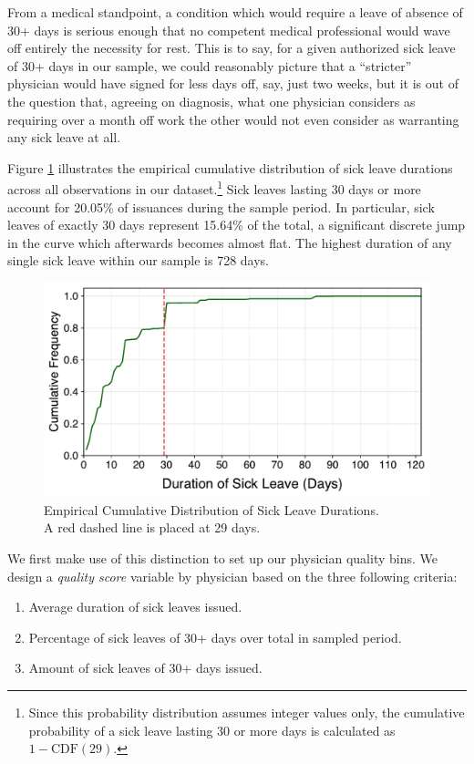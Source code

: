 \documentclass[../main.tex]{subfiles}
\begin{document}
From a medical standpoint, a condition which would require a leave of absence of 30+ days is serious enough that no competent medical professional would wave off entirely the necessity for rest. This is to say, for a given authorized sick leave of 30+ days in our sample, we could reasonably picture that a ``stricter'' physician would have signed for less days off, say, just two weeks, but it is out of the question that, agreeing on diagnosis, what one physician considers as requiring over a month off work the other would not even consider as warranting any sick leave at all.

Figure \ref{fig:cdf} illustrates the empirical cumulative distribution of sick leave durations across all observations in our dataset.\footnote{Since this probability distribution assumes integer values only, the cumulative probability of a sick leave lasting 30 or more days is calculated as $1 - \text{CDF}(29)$.} Sick leaves lasting 30 days or more account for 20.05\% of issuances during the sample period. In particular, sick leaves of exactly 30 days represent 15.64\% of the total, a significant discrete jump in the curve which afterwards becomes almost flat. The highest duration of any single sick leave within our sample is 728 days.

\begin{figure}[H]
    \centering
    \includegraphics[width=0.70\linewidth]{cdf.pdf}
    \captionsetup{justification=centerlast}
    \caption{Empirical Cumulative Distribution of Sick Leave Durations. \\ A red dashed line is placed at 29 days.}
    \label{fig:cdf}
\end{figure}



We first make use of this distinction to set up our physician quality bins. We design a \textit{quality score} variable by physician based on the three following criteria:
\begin{enumerate}[label=\roman*, itemsep=0pt, topsep=0pt]
    \item Average duration of sick leaves issued.
    \item Percentage of sick leaves of 30+ days over total in sampled period.
    \item Amount of sick leaves of 30+ days issued.
\end{enumerate}
\end{document}
